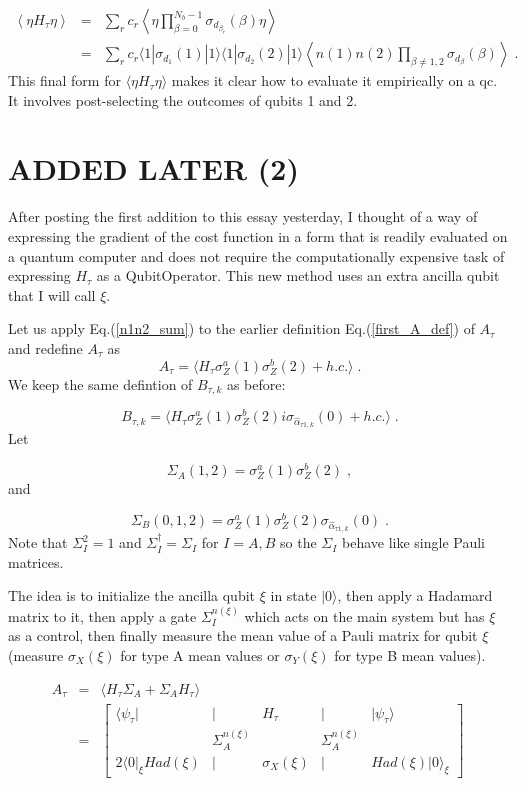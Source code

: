 \documentclass[12pt]{article}
\newcommand{\bra}[1]{\langle#1|}
\newcommand{\ket}[1]{|#1\rangle}
\newcommand{\beq}{\begin{equation}}
\newcommand{\eeq}{\end{equation}}
\newcommand{\beqa}{\begin{eqnarray}}
\newcommand{\eeqa}{\end{eqnarray}}
\begin{document}
{\beqa
\left\langle\eta H_\tau\eta \right\rangle &=&
\sum_r c_r
\left\langle\eta
\prod_{\beta=0}^{N_b-1}
\sigma_{d_{\beta_r}}(\beta) \eta\right\rangle
\\
&=&\sum_r c_r
\bra{1}\sigma_{d_1}(1)\ket{1}
\bra{1}\sigma_{d_2}(2)\ket{1}
\left\langle n(1)n(2)
\prod_{\beta\neq 1,2}
\sigma_{d_\beta}(\beta)\right\rangle
\;.
\eeqa
This final form for $\langle\eta H_\tau \eta\rangle$
makes it clear how to
evaluate it empirically on a qc. It involves
post-selecting the outcomes of qubits 1 and 2.


\section*{ADDED LATER (2)}

After posting the first addition 
to this essay yesterday, I
thought of a way of expressing the 
gradient of the cost function in a 
form that is readily evaluated on
a quantum computer and does not require
the computationally expensive task of
expressing $H_\tau$
as a QubitOperator. This new method uses an extra
ancilla qubit that I will call $\xi$.

Let us apply Eq.(\ref{n1n2_sum}) to the earlier
definition Eq.(\ref{first_A_def}) of $A_\tau$
and redefine $A_\tau$ as
\beq
A_\tau = \langle H_\tau \sigma^a_Z(1)\sigma_Z^b(2) + h.c.\rangle
\;.
\eeq
We keep the same defintion of $B_{\tau,k}$ as before:

\beq
B_{\tau,k} = \langle H_\tau \sigma^a_Z(1)\sigma_Z^b(2)
i \sigma_{\hat{\alpha}_{\tau 1,k}}(0) + h.c.\rangle
\;.
\eeq
Let


\beq
\Sigma_A(1,2) = \sigma^a_Z(1)\sigma_Z^b(2)
\;,
\eeq
and

\beq
\Sigma_B(0, 1,2) = \sigma^a_Z(1)\sigma_Z^b(2)
\sigma_{\hat{\alpha}_{\tau 1,k}}(0)
\;.
\eeq
Note that 
$\Sigma_I^2 = 1$ and $\Sigma_I^\dagger = \Sigma_I$
for $I=A,B$ so the $\Sigma_I$ 
behave like single Pauli matrices.

The idea is to initialize
the ancilla qubit $\xi$ in state $\ket{0}$,
then apply a Hadamard matrix to it,
then apply a gate $\Sigma_I^{n(\xi)}$
which acts on the main system but has $\xi$
as a control, then finally
measure 
the mean value of a Pauli matrix for qubit $\xi$
(measure $\sigma_X(\xi)$ for type A mean values 
or $\sigma_Y(\xi)$ for type B mean values).


\beqa
A_\tau&=& 
\langle H_\tau \Sigma_A + \Sigma_A H_\tau \rangle
\\
&=&
\left[
\begin{array}{ccccc}
\bra{\psi_\tau}
&\mid&H_\tau&\mid&\ket{\psi_\tau}\\
&\Sigma_A^{n(\xi)}&&\Sigma_A^{n(\xi)}&\\
2\bra{0}_\xi
Had(\xi)&\mid&\sigma_X(\xi)&\mid&Had(\xi)\ket{0}_\xi
\end{array}
\right]
\;
\eeqa

}
\end{document}
